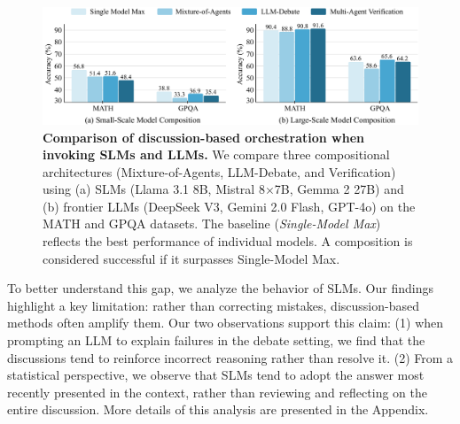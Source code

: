 


\begin{figure}[htbp]
  \centering
  \includegraphics[width=0.9\linewidth]{Figures/Small-large-acc-light-blue_v2.pdf}
  \vspace{-8pt}
  \caption{\small \textbf{Comparison of discussion-based orchestration when invoking SLMs and LLMs.} We compare three compositional architectures (Mixture-of-Agents, LLM-Debate, and Verification) using (a) SLMs (Llama 3.1 8B, Mistral 8$\times$7B, Gemma 2 27B) and (b) frontier LLMs (DeepSeek V3, Gemini 2.0 Flash, GPT-4o) on the \textsc{MATH} and \textsc{GPQA} datasets. The baseline (\textit{Single-Model Max}) reflects the best performance of individual models. A composition is considered successful if it surpasses Single-Model Max.}\label{fig:small-large-accuracy}
  \vspace{-10pt}
\end{figure}



To better understand this gap, we analyze the behavior of SLMs. Our findings highlight a key limitation: rather than correcting mistakes, discussion-based methods often amplify them. Our two observations support this claim: (1) when prompting an LLM to explain failures in the debate setting, we find that the discussions tend to reinforce incorrect reasoning rather than resolve it. (2) From a statistical perspective, we observe that SLMs tend to adopt the answer most recently presented in the context, rather than reviewing and reflecting on the entire discussion. More details of this analysis are presented in the Appendix.

